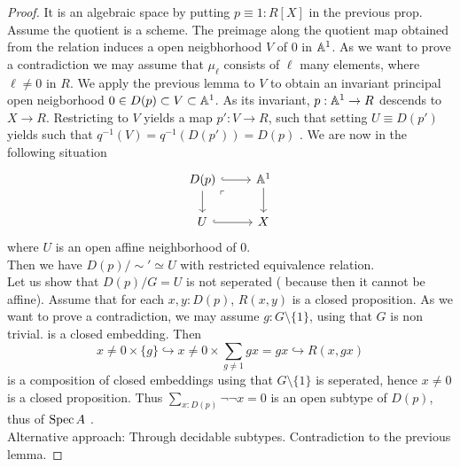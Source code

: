 \begin{proof}
	It is an algebraic space by putting $p \equiv 1 : R[X]$ in the previous prop. \\
	Assume the quotient is a scheme. 
	The preimage along the quotient map obtained from the relation induces a open neigbhorhood $V$ of $0$ in $\mathbb{A}^1$. As we want to prove a contradiction we may assume that $\mu_\ell$ consists of $\ell$ many elements, where $\ell \neq 0 $ in $R$. We apply the previous lemma to $V$ to obtain an invariant principal open neigborhood $0 \in D(p) \subset V \subset \mathbb{A}^1$. As its invariant, $p : \mathbb{A}^1 \to R$ descends to $X \to R$. Restricting to $V$ yields a map $p' : V \to R$, such that setting $U \equiv D(p')$ yields such that $q^{-1}(V) =q^{-1}(D(p')) = D(p)$ . We are now in the following situation
	\[\begin{tikzcd}
		{D(p)} & {\bA^1} \\
		U & X
		\arrow[hook, from=1-1, to=1-2]
		\arrow[from=1-1, to=2-1]
		\arrow["\ulcorner"{anchor=center, pos=0.125}, draw=none, from=1-1, to=2-2]
		\arrow[from=1-2, to=2-2]
		\arrow[hook, from=2-1, to=2-2]
	\end{tikzcd}\]
	where $U$ is an open affine neighborhood of 0. \\
	Then we have $D(p) / \sim' \simeq U$ with restricted equivalence relation. \\
	Let us show that $D(p) / G = U$ is not seperated ( because then it cannot be affine). Assume that for each $x , y : D(p)$, $R(x,y)$ is a closed proposition. As we want to prove a contradiction, we may assume $g : G \setminus \{1\}$, using that $G$ is non trivial.
	is a closed embedding. Then 
	\[
	x\neq 0 \times \{g\} \hookrightarrow x \neq 0 \times \sum_{g \neq 1} g x = g x \hookrightarrow  R(x,gx) 
	\]
	is a composition of closed embeddings using that $G \setminus \{1\}$ is seperated, hence $x \neq 0$ is a closed proposition. Thus $\sum_{x: D(p)} \lnot \lnot x = 0$ is an open subtype of $D(p)$, thus of $\operatorname{Spec} A$ .\\
	Alternative approach: Through decidable subtypes.
	 Contradiction to the previous lemma. %
\end{proof}
